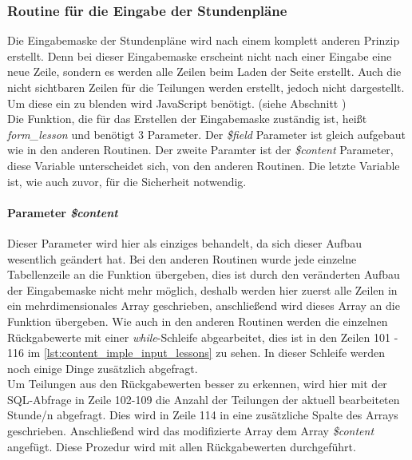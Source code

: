 \subsubsection{Routine für die Eingabe der Stundenpläne}
Die Eingabemaske der Stundenpläne wird nach einem komplett anderen Prinzip erstellt. Denn bei dieser Eingabemaske erscheint nicht nach einer Eingabe eine neue Zeile, sondern es werden alle Zeilen beim Laden der Seite erstellt. Auch die nicht sichtbaren Zeilen für die Teilungen werden erstellt, jedoch nicht dargestellt. Um diese ein zu blenden wird JavaScript benötigt. (siehe Abschnitt )\\
Die Funktion, die für das Erstellen der Eingabemaske zuständig ist, heißt \textit{form\_lesson} und benötigt 3 Parameter. Der \textit{\$field} Parameter ist gleich aufgebaut wie in den anderen Routinen. Der zweite Paramter ist der \textit{\$content} Parameter, diese Variable unterscheidet sich, von den anderen Routinen. Die letzte Variable ist, wie auch zuvor, für die Sicherheit notwendig.
\paragraph{Parameter \textit{\$content}\\}
Dieser Parameter wird hier als einziges behandelt, da sich dieser Aufbau wesentlich geändert hat. Bei den anderen Routinen wurde jede einzelne Tabellenzeile an die Funktion übergeben, dies ist durch den veränderten Aufbau der Eingabemaske nicht mehr möglich, deshalb werden hier zuerst alle Zeilen in ein mehrdimensionales Array geschrieben, anschließend wird dieses Array an die Funktion übergeben. Wie auch in den anderen Routinen werden die einzelnen Rückgabewerte mit einer \textit{while}-Schleife abgearbeitet, dies ist in den Zeilen 101 - 116 im \autoref{lst:content_imple_input_lessons} zu sehen. In dieser Schleife werden noch einige Dinge zusätzlich abgefragt.\\
Um Teilungen aus den Rückgabewerten besser zu erkennen, wird hier mit der SQL-Abfrage in Zeile 102-109 die Anzahl der Teilungen der aktuell bearbeiteten Stunde/n abgefragt. Dies wird in Zeile 114 in eine zusätzliche Spalte des Arrays geschrieben. Anschließend wird das modifizierte Array dem Array \textit{\$content} angefügt. Diese Prozedur wird mit allen Rückgabewerten durchgeführt.\\

